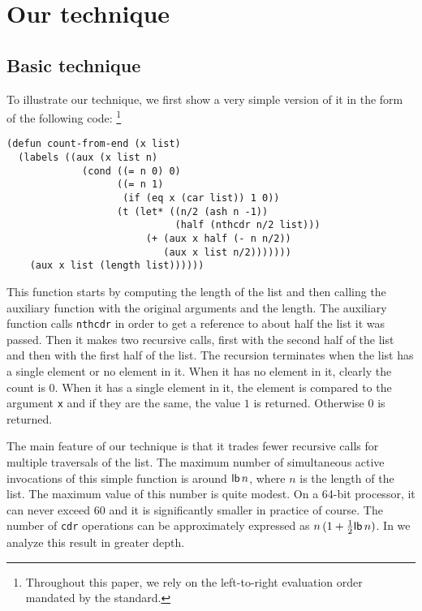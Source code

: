 \section{Our technique}

\subsection{Basic technique}
\label{sec-basic-technique}

To illustrate our technique, we first show a very simple version of it
in the form of the following code:%
\footnote{Throughout this paper, we rely on the left-to-right
  evaluation order mandated by the \commonlisp{} standard.}

{\small
\begin{verbatim}
(defun count-from-end (x list)
  (labels ((aux (x list n)
             (cond ((= n 0) 0)
                   ((= n 1)
                    (if (eq x (car list)) 1 0))
                   (t (let* ((n/2 (ash n -1))
                             (half (nthcdr n/2 list)))
                        (+ (aux x half (- n n/2))
                           (aux x list n/2)))))))
    (aux x list (length list))))))
\end{verbatim}
}

This function starts by computing the length of the list and then
calling the auxiliary function with the original arguments and the
length.  The auxiliary function calls \texttt{nthcdr} in order to get
a reference to about half the list it was passed.  Then it makes two
recursive calls, first with the second half of the list and then with
the first half of the list.  The recursion terminates when the list has
a single element or no element in it.  When it has no element in it,
clearly the count is $0$.  When it has a single element in it, the
element is compared to the argument \texttt{x} and if they are the
same, the value $1$ is returned.  Otherwise $0$ is returned.

The main feature of our technique is that it trades fewer recursive
calls for multiple traversals of the list.  The maximum number of
simultaneous active invocations of this simple function is around
$\mathsf{lb}\thinspace n$, where $n$ is the length of the list.  The
maximum value of this number is quite modest.  On a 64-bit processor,
it can never exceed $60$ and it is significantly smaller in practice
of course.  
The number of \texttt{cdr} operations can be
approximately expressed as $n\thinspace (1 +
\frac{1}{2}\mathsf{lb}\thinspace n)$.  In  we
analyze this result in greater depth.

